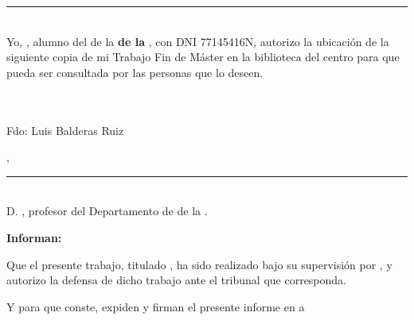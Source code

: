 \documentclass['../proyecto.tex']{memoir}
\begin{document}
\thispagestyle{empty}

\noindent\rule[-1ex]{\textwidth}{2pt}\\[4.5ex]

Yo, \textbf{\AuthorName}, alumno del \Degree de la
\textbf{\FacultyOne de la \University}, con DNI 77145416N, autorizo la
ubicación de la siguiente copia de mi Trabajo Fin de Máster en la
biblioteca del centro para que pueda ser consultada por las personas
que lo deseen.

\vspace{6cm}

\\~\\
\noindent Fdo: Luis Balderas Ruiz

\vspace{2cm}

\begin{flushright}
  \Location, \Time
\end{flushright}

\newpage

\thispagestyle{empty}

\noindent\rule[-1ex]{\textwidth}{2pt}\\[4.5ex]

D. \textbf{\MainProf}, profesor del Departamento de
\Department de la \University.

\vspace{0.5cm}

\textbf{Informan:}

\vspace{0.5cm}

Que el presente trabajo, titulado \textit{\textbf{\ProjectTitle}}, ha
sido realizado bajo su supervisión por \textbf{\AuthorName}, y
autorizo la defensa de dicho trabajo ante el tribunal que
corresponda.

\vspace{0.5cm}

Y para que conste, expiden y firman el presente informe en \Location a \Time

\vspace{1cm}

\textbf{\MainProf}

\vspace{5cm}


\newpage
\end{document}
